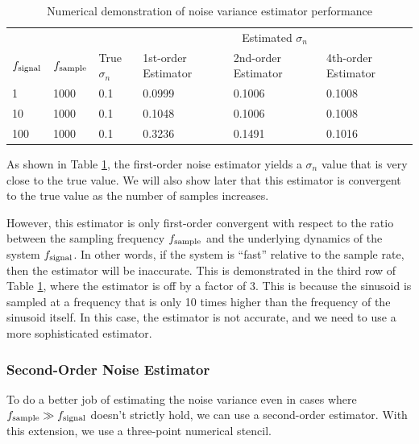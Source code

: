 \documentclass[conf]{new-aiaa}
\begin{document}
    \begin{table}[!htb]
        \centering
        \caption{Numerical demonstration of noise variance estimator performance}
        \label{tab:noise_variance_demo}
        \begin{tabular}{@{}lll|lll@{}}
            \toprule
            & & & \multicolumn{3}{c}{Estimated $\sigma_n$} \\
            $f_{\rm signal}$ & $f_{\rm sample}$ & True $\sigma_n$ & 1st-order Estimator & 2nd-order Estimator & 4th-order Estimator \\ \midrule
            1                & 1000             & 0.1             & 0.0999              & 0.1006              & 0.1008              \\
            10               & 1000             & 0.1             & 0.1048              & 0.1006              & 0.1008              \\
            100              & 1000             & 0.1             & 0.3236              & 0.1491              & 0.1016              \\ \bottomrule
        \end{tabular}
    \end{table}

    As shown in Table \ref{tab:noise_variance_demo}, the first-order noise estimator yields a $\sigma_n$ value that is very close to the true value. We will also show later that this estimator is convergent to the true value as the number of samples increases.

    However, this estimator is only first-order convergent with respect to the ratio between the sampling frequency $f_{\rm sample}$ and the underlying dynamics of the system $f_{\rm signal}$. In other words, if the system is ``fast'' relative to the sample rate, then the estimator will be inaccurate. This is demonstrated in the third row of Table \ref{tab:noise_variance_demo}, where the estimator is off by a factor of 3. This is because the sinusoid is sampled at a frequency that is only 10 times higher than the frequency of the sinusoid itself. In this case, the estimator is not accurate, and we need to use a more sophisticated estimator.

    \subsubsection{Second-Order Noise Estimator}

    To do a better job of estimating the noise variance even in cases where $f_{\rm sample} \gg f_{\rm signal}$ doesn't strictly hold, we can use a second-order estimator. With this extension, we use a three-point numerical stencil.
\end{document}
